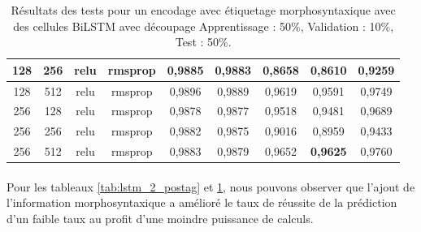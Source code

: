 \begin{table}[H]
{\begin{tabular}{|c|c|c|c|c|c|c|c|c|}
				128 & 256 & relu & rmsprop & 0,9885 & 0,9883 & 0,8658 & 0,8610 & 0,9259 \\ \hline
				128 & 512 & relu & rmsprop & 0,9896 & 0,9889 & 0,9619 & 0,9591 & 0,9749 \\ \hline
				256 & 128 & relu & rmsprop & 0,9878 & 0,9877 & 0,9518 & 0,9481 & 0,9689 \\ \hline
				256 & 256 & relu & rmsprop & 0,9882 & 0,9875 & 0,9016 & 0,8959 & 0,9433 \\ \hline
				256 & 512 & relu & rmsprop & 0,9883 & 0,9879 & 0,9652 & \textbf{0,9625} & 0,9760 \\ \hline
			\end{tabular}%
		}
		\caption{Résultats des tests pour un encodage avec étiquetage morphosyntaxique avec des cellules BiLSTM avec découpage Apprentissage : 50\%, Validation : 10\%, Test : 50\%.}
		\label{tab:bilstm_2_postag}
	\end{table}
	\paragraph{}
	Pour les tableaux \ref{tab:lstm_2_postag} et \ref{tab:bilstm_2_postag}, nous pouvons observer que l'ajout de l'information morphosyntaxique a amélioré le taux de réussite de la prédiction d'un faible taux au profit d'une moindre puissance de calculs.
	

